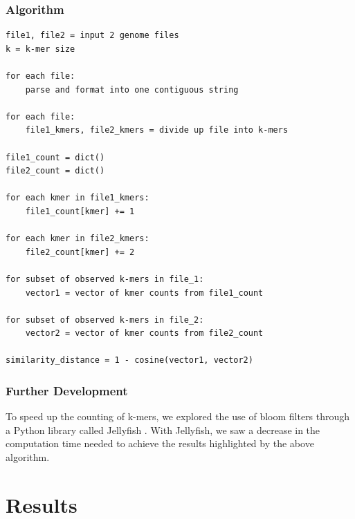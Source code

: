 \documentclass[12pt, letterpaper]{article}
\begin{document}
\subsubsection{Algorithm}
\begin{verbatim}
file1, file2 = input 2 genome files 
k = k-mer size

for each file:
    parse and format into one contiguous string

for each file:
    file1_kmers, file2_kmers = divide up file into k-mers

file1_count = dict()
file2_count = dict()

for each kmer in file1_kmers:
    file1_count[kmer] += 1

for each kmer in file2_kmers:
    file2_count[kmer] += 2

for subset of observed k-mers in file_1:
    vector1 = vector of kmer counts from file1_count

for subset of observed k-mers in file_2:
    vector2 = vector of kmer counts from file2_count

similarity_distance = 1 - cosine(vector1, vector2)
\end{verbatim}

\subsubsection{Further Development}
To speed up the counting of k-mers, we explored the use of bloom filters through a Python library called Jellyfish \cite{Jellyfish}. With Jellyfish, we saw a decrease in the computation time needed to achieve the results highlighted by the above algorithm.

\section{Results}
\end{document}

